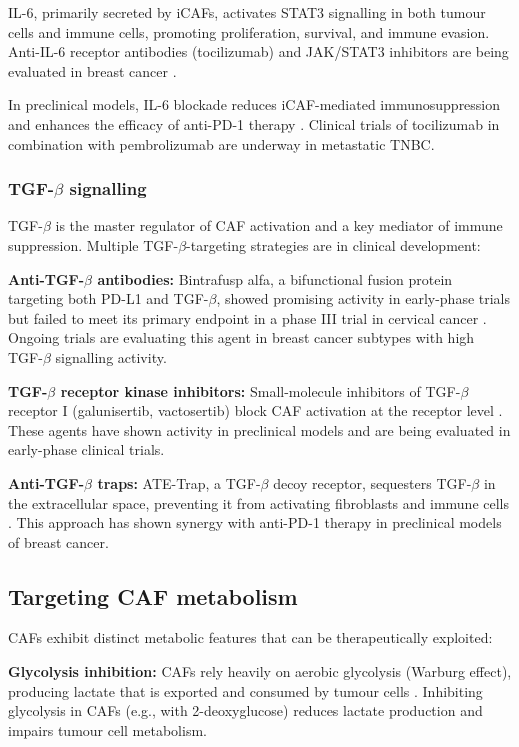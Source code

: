 IL-6, primarily secreted by iCAFs, activates STAT3 signalling in both tumour cells and immune cells, promoting proliferation, survival, and immune evasion. Anti-IL-6 receptor antibodies (tocilizumab) and JAK/STAT3 inhibitors are being evaluated in breast cancer \citep{chang2014}.

In preclinical models, IL-6 blockade reduces iCAF-mediated immunosuppression and enhances the efficacy of anti-PD-1 therapy \citep{erve2024}. Clinical trials of tocilizumab in combination with pembrolizumab are underway in metastatic TNBC.

\subsubsection{TGF-$\beta$ signalling}

TGF-$\beta$ is the master regulator of CAF activation and a key mediator of immune suppression. Multiple TGF-$\beta$-targeting strategies are in clinical development:

\textbf{Anti-TGF-$\beta$ antibodies:} Bintrafusp alfa, a bifunctional fusion protein targeting both PD-L1 and TGF-$\beta$, showed promising activity in early-phase trials but failed to meet its primary endpoint in a phase III trial in cervical cancer \citep{strauss2023}. Ongoing trials are evaluating this agent in breast cancer subtypes with high TGF-$\beta$ signalling activity.

\textbf{TGF-$\beta$ receptor kinase inhibitors:} Small-molecule inhibitors of TGF-$\beta$ receptor I (galunisertib, vactosertib) block CAF activation at the receptor level \citep{herbertz2015}. These agents have shown activity in preclinical models and are being evaluated in early-phase clinical trials.

\textbf{Anti-TGF-$\beta$ traps:} ATE-Trap, a TGF-$\beta$ decoy receptor, sequesters TGF-$\beta$ in the extracellular space, preventing it from activating fibroblasts and immune cells \citep{teicher2021}. This approach has shown synergy with anti-PD-1 therapy in preclinical models of breast cancer.

\subsection{Targeting CAF metabolism}

CAFs exhibit distinct metabolic features that can be therapeutically exploited:

\textbf{Glycolysis inhibition:} CAFs rely heavily on aerobic glycolysis (Warburg effect), producing lactate that is exported and consumed by tumour cells \citep{martinez2020}. Inhibiting glycolysis in CAFs (e.g., with 2-deoxyglucose) reduces lactate production and impairs tumour cell metabolism.

